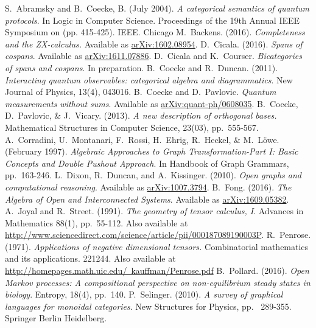 \documentclass[11pt]{amsart}
\theoremstyle{remark}
\theoremstyle{definition}
\begin{document}
\begin{thebibliography}{100}	
	S.~Abramsky and B.~Coecke, B. 
	(July 2004).
	\emph{A categorical semantics of quantum protocols}. 
	In Logic in Computer Science. 
	Proceedings of the 19th Annual IEEE Symposium on (pp. 415-425). IEEE.
	Chicago	
	M.~Backens.
	(2016). 
	\emph{Completeness and the ZX-calculus.} 
	Available as \href{https://arxiv.org/abs/1602.08954}{arXiv:1602.08954}.
	D.~Cicala.
	(2016). 
	\emph{Spans of cospans}.
	Available as \href{https://arxiv.org/abs/1611.07886}{arXiv:1611.07886}.
	D.~Cicala and K.~Courser.
	\emph{Bicategories of spans and cospans}.
	In preparation.
	B.~Coecke and R.~Duncan. 
	(2011). 
	\emph{Interacting quantum observables: categorical algebra and diagrammatics}. 
	New Journal of Physics, 13(4), 043016.
	B.~Coecke and D.~Pavlovic. 
	\emph{Quantum measurements without sums}. 
	Available as \href{https://arxiv.org/abs/quant-ph/0608035}{arXiv:quant-ph/0608035}.
	B.~Coecke, D.~Pavlovic, \& J.~Vicary. 
	(2013).
	\emph{A new description of orthogonal bases.} 
	Mathematical Structures in Computer Science, 23(03), pp.~555-567.
	A.~Corradini, U.~Montanari, F.~Rossi, H.~Ehrig, R.~Heckel, \& M.~L\"{o}we.
	(February 1997).
	\emph{Algebraic Approaches to Graph Transformation-Part I: Basic Concepts and Double Pushout Approach}. 
	In Handbook of Graph Grammars, pp.~163-246.
	L.~Dixon, R.~Duncan, and A.~Kissinger. 
	(2010).
	\emph{Open graphs and computational reasoning}. 
	Available as \href{https://arxiv.org/abs/1007.3794}{arXiv:1007.3794}.
	B.~Fong. 
	(2016).
	\emph{The Algebra of Open and Interconnected Systems}. 
	Available as \href{https://arxiv.org/abs/arXiv:1609.05382}{arXiv:1609.05382}. 
	A.~Joyal and R.~Street.
	(1991).
	 \emph{The geometry of tensor calculus, I}. 
	 Advances in Mathematics 88(1), pp.~55-112.
	 Also available at \href{http://www.sciencedirect.com/science/article/pii/000187089190003P}{http://www.sciencedirect.com/science/article/pii/000187089190003P}.
	R.~Penrose. 
	(1971).
	\emph{Applications of negative dimensional tensors.} 
	Combinatorial mathematics and its applications.  221244.  
	Also available at \href{http://homepages.math.uic.edu/~kauffman/Penrose.pdf}{http://homepages.math.uic.edu/~kauffman/Penrose.pdf}
	B.~Pollard. 
	(2016).
	\emph{Open Markov processes: A compositional perspective on non-equilibrium steady states in biology}. Entropy, 18(4), pp.~140. 
	P.~Selinger. 
	(2010).
	\emph{A survey of graphical languages for monoidal categories}. 
	New Structures for Physics, pp. ~289-355. Springer Berlin Heidelberg. 
\end{thebibliography}


%
%
\end{document}
